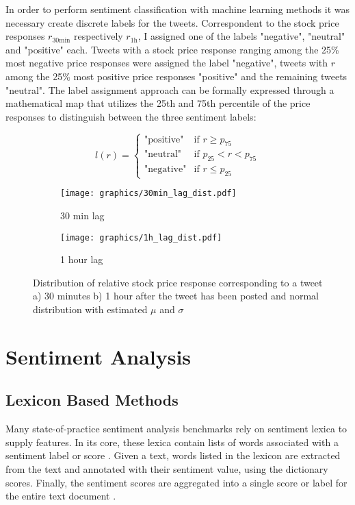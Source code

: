 \documentclass[a4paper,12pt]{article}%
\begin{document}
In order to perform sentiment classification with machine learning methods it was necessary create discrete labels for the tweets. Correspondent to the stock price responses $r_{30\text{min}}$ respectively $r_{1 \text{h}}$, I assigned one of the labels "negative", "neutral" and "positive" each. Tweets with a stock price response ranging among the 25\% most negative price responses were assigned the label "negative", tweets with $r$ among the 25\% most positive price responses "positive" and the remaining tweets "neutral". The label assignment approach can be formally expressed through a mathematical map that utilizes the 25th and 75th percentile of the price responses to distinguish between the three sentiment labels:

$$ 
 l(r) =
   \begin{cases}
     \text{"positive"} & \text{if } r \geq p_{75}\\
     \text{"neutral"}  & \text{if }  p_{25} < r < p_{75} \\
     \text{"negative"}  & \text{if } r \leq p_{25}
   \end{cases}
$$




\begin{figure}
\captionsetup{justification=centering}
 \begin{subfigure}[b]{0.5\textwidth}
        \centering
        \texttt{[image: graphics/30min\_lag\_dist.pdf]}
        \caption{30 min lag}
   \end{subfigure}
 \begin{subfigure}[b]{0.5\textwidth}
        \centering
        \texttt{[image: graphics/1h\_lag\_dist.pdf]}
        \caption{1 hour lag}
   \end{subfigure}
\caption{Distribution of relative stock price response corresponding to a tweet a) 30 minutes b) 1 hour after the tweet has been posted and normal distribution with estimated $\mu$ and $\sigma$  \label{fig:lags_hist}}
\end{figure}



\section{Sentiment Analysis}

\subsection{Lexicon Based Methods} \label{lexicon-based}
Many state-of-practice sentiment analysis benchmarks rely on sentiment lexica to supply features. In its core, these lexica contain lists of words associated with a sentiment label or score . Given a text, words listed in the lexicon are extracted from the text and annotated with their sentiment value, using the dictionary scores. Finally, the sentiment scores are aggregated into a single score or label for the entire text document \citep{Taboada2011}.\\
\end{document}

